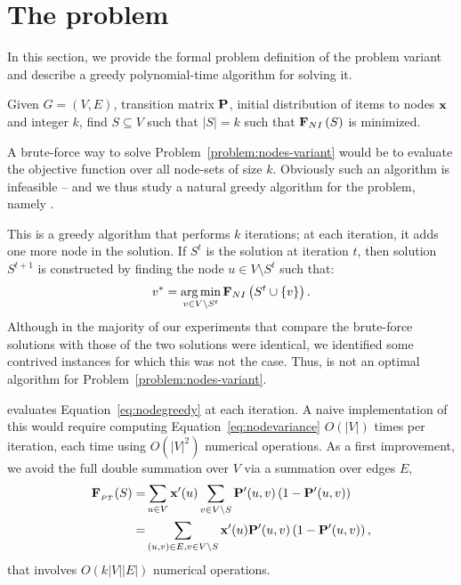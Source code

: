 \section{The {\variant{\nodeitems}} problem}
\label{sec:nodes}

In this section, we provide the formal problem definition 
of the {\variant{\nodeitems}} problem variant and describe a greedy 
polynomial-time algorithm for solving it.
\begin{problem}[{\variant{\nodeitems}}]
Given $G=(V,E)$, transition matrix $\mathbf{P}$, initial distribution of items to nodes
$\mathbf{x}$ and integer $k$, find
$S\subseteq V$ such that $|S|=k$ such that 
$\mathbf{F}_{\sc NI}\left(S\right)$ is minimized.
\label{problem:nodes-variant}
\end{problem}
A brute-force way to solve Problem~\ref{problem:nodes-variant}
would be to evaluate the objective function over all node-sets of size $k$.
Obviously such an algorithm is infeasible -- and we thus
study a natural greedy algorithm for the problem, namely \nodegreedy.

This is a greedy algorithm that performs $k$ iterations; at each iteration,
it adds one more 
node in the solution.
If $S^t$ is the solution at iteration $t$, 
then solution $S^{t+1}$ is constructed by finding the 
node $u\in V\setminus S^t$ such that:
\begin{equation}\label{eq:nodegreedy}
v^\ast=\operatorname*{arg\,min}_{v\in V\setminus S^t}\mathbf{F}_{\sc NI}\left(S^{t}\cup\{v\}\right).
\end{equation}
Although in the majority of our experiments that compare the brute-force solutions with those
of {\nodegreedy} the two solutions were identical, we identified some contrived instances 
for which this was not the case. Thus, {\nodegreedy} is not an optimal algorithm for
Problem~\ref{problem:nodes-variant}.


{\nodegreedy} evaluates Equation~\eqref{eq:nodegreedy} at each iteration. 
A naive implementation of this would require computing Equation~\eqref{eq:nodevariance}
$O(|V|)$ times per iteration, each time using $O(|V|^2)$ numerical operations.
As a first improvement, we avoid the full double summation over $V$
via a summation over edges $E$,
\begin{align}
	\mathbf{F}_{_{\sc PT}}(S) = & \sum_{u\in V}\mathbf{x}^{\prime}(u)\sum_{v\in V\setminus S}\mathbf{P}^{\prime}(u,v)\left(1-\mathbf{P}^{\prime}(u,v)\right) \nonumber \\ 
	= &  \sum_{(u,v)\in E, v\in V\setminus S} 
	\mathbf{x}^{\prime}(u)\mathbf{P}^{\prime}(u,v)\left(1-\mathbf{P}^{\prime}(u,v)\right),
\end{align}
that involves $O(k|V||E|)$ numerical operations.

